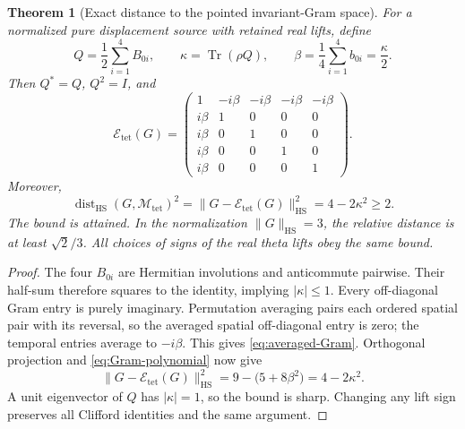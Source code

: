\documentclass[11pt]{article}
\newtheorem{theorem}{Theorem}[section]
\theoremstyle{definition}
\theoremstyle{remark}
\newcommand{\Tr}{\operatorname{Tr}}
\newcommand{\dist}{\operatorname{dist}}
\newcommand{\HS}{\mathrm{HS}}
\newcommand{\norm}[1]{\lVert#1\rVert}
\newcommand{\AR}{\mathcal E_{\mathrm{tet}}}
\newcommand{\Mtet}{\mathscr M_{\mathrm{tet}}}
\begin{document}
\begin{theorem}[Exact distance to the pointed invariant-Gram space]
\label{thm:sharp-gap}
For a normalized pure displacement source with retained real lifts, define
\begin{equation}
 Q=\frac12\sum_{i=1}^4 B_{0i},\qquad
 \kappa=\Tr(\rho Q),\qquad
 \beta=\frac14\sum_{i=1}^4b_{0i}=\frac\kappa2.
 \label{eq:kappa}
\end{equation}
Then $Q^*=Q$, $Q^2=I$, and
\begin{equation}
 \AR(G)=
 \begin{pmatrix}
 1&-i\beta&-i\beta&-i\beta&-i\beta\\
 i\beta&1&0&0&0\\
 i\beta&0&1&0&0\\
 i\beta&0&0&1&0\\
 i\beta&0&0&0&1
 \end{pmatrix}.
 \label{eq:averaged-Gram}
\end{equation}
Moreover,
\begin{equation}
 \boxed{
 \dist_{\HS}(G,\Mtet)^2
 =\norm{G-\AR(G)}_{\HS}^2
 =4-2\kappa^2\ge2.}
 \label{eq:sharp-gap}
\end{equation}
The bound is attained. In the normalization $\norm G_{\HS}=3$, the relative
distance is at least $\sqrt2/3$. All choices of signs of the real theta lifts
obey the same bound.
\end{theorem}
\begin{proof}
The four $B_{0i}$ are Hermitian involutions and anticommute pairwise. Their
half-sum therefore squares to the identity, implying $|\kappa|\le1$.
Every off-diagonal Gram entry is purely imaginary. Permutation averaging
pairs each ordered spatial pair with its reversal, so the averaged spatial
off-diagonal entry is zero; the temporal entries average to $-i\beta$.
This gives \eqref{eq:averaged-Gram}. Orthogonal projection and
\eqref{eq:Gram-polynomial} now give
\[
 \norm{G-\AR(G)}_{\HS}^2
 =9-\bigl(5+8\beta^2\bigr)=4-2\kappa^2.
\]
A unit eigenvector of $Q$ has $|\kappa|=1$, so the bound is sharp. Changing
any lift sign preserves all Clifford identities and the same argument.
\end{proof}
\end{document}
